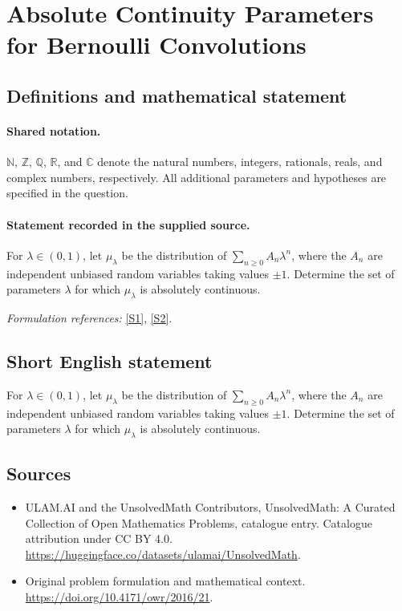 \documentclass[11pt]{article}
\newcommand{\sref}[2]{\hyperlink{source:#1:#2}{[S#2]}}
\begin{document}
\section{Absolute Continuity Parameters for Bernoulli Convolutions}\label{statement}

\subsection{Definitions and mathematical statement}

\paragraph{Shared notation.}$\mathbb N$, $\mathbb Z$, $\mathbb Q$, $\mathbb R$, and $\mathbb C$ denote the natural numbers, integers, rationals, reals, and complex numbers, respectively. All additional parameters and hypotheses are specified in the question.


\paragraph{Statement recorded in the supplied source.}
For $\lambda\in(0,1)$, let $\mu_\lambda$ be the distribution of $\sum_{n\geq0}A_n\lambda^n$, where the $A_n$ are independent unbiased random variables taking values $\pm1$. Determine the set of parameters $\lambda$ for which $\mu_\lambda$ is absolutely continuous.
\par\smallskip\textit{Formulation references:} \sref{statement}{1}, \sref{statement}{2}.
\subsection{Short English statement}
For $\lambda\in(0,1)$, let $\mu_\lambda$ be the distribution of $\sum_{n\geq0}A_n\lambda^n$, where the $A_n$ are independent unbiased random variables taking values $\pm1$. Determine the set of parameters $\lambda$ for which $\mu_\lambda$ is absolutely continuous.
\subsection{Sources}
\begin{itemize}
\item[\hypertarget{source:statement:1}{S1}] ULAM.AI and the UnsolvedMath Contributors, UnsolvedMath: A Curated Collection of Open Mathematics Problems, catalogue entry. Catalogue attribution under CC BY 4.0.
\url{https://huggingface.co/datasets/ulamai/UnsolvedMath}.
\item[\hypertarget{source:statement:2}{S2}] Original problem formulation and mathematical context.
\url{https://doi.org/10.4171/owr/2016/21}.
\end{itemize}
\label{end:statement}
\end{document}
